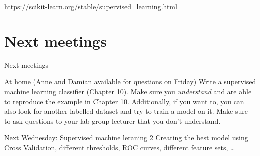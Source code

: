 \documentclass{beamer}
\begin{document}
\begin{frame}
\large{\url{https://scikit-learn.org/stable/supervised_learning.html}}
\end{frame}




\section{Next meetings}
\begin{frame}{Next meetings}
\begin{block}{At home (Anne and Damian available for questions on Friday)}
Write a supervised machine learning classifier (Chapter 10). Make sure you \emph{understand} and are able to reproduce the example in Chapter 10. Additionally, if you want to, you can also look for another labelled dataset and try to train a model on it. Make sure to ask questions to your lab group lecturer that you don't understand.
\end{block}

\begin{block}{Next Wednesday: Supervised machine leraning 2}
Creating the best model using Cross Validation, different thresholds, ROC curves, different feature sets, \ldots
\end{block}



\end{frame}
\end{document}
